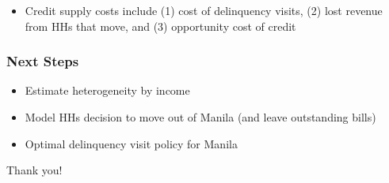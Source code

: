 \documentclass[aspectratio=149]{beamer}
\begin{document}
\begin{frame}
{} %


\begin{itemize}
   \item Credit supply costs include (1) cost of delinquency visits, (2) lost revenue from HHs that move, and (3) opportunity cost of credit
\end{itemize}

\end{frame}



\begin{frame}

\frametitle{Next Steps}

\begin{itemize}
  \item Estimate heterogeneity by income
  \item Model HHs decision to move out of Manila (and leave outstanding bills)
  \item Optimal delinquency visit policy for Manila
\end{itemize}
\vspace{2mm}
Thank you!

\end{frame}
\end{document}
